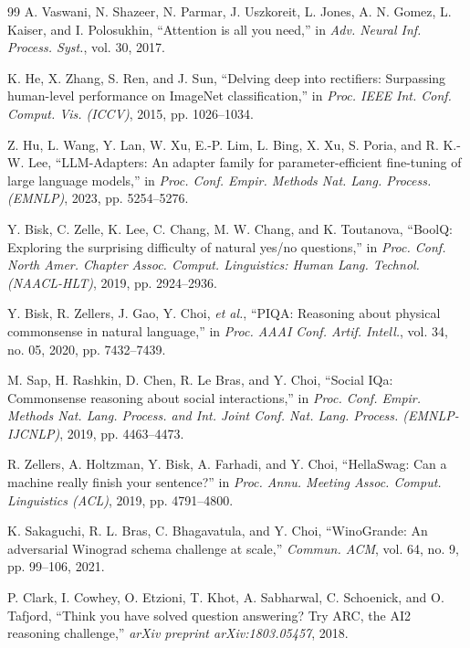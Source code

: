 \documentclass[a4paper,11pt]{article}
\begin{document}
\begin{thebibliography}{99}
A. Vaswani, N. Shazeer, N. Parmar, J. Uszkoreit, L. Jones, A. N. Gomez, L. Kaiser, and I. Polosukhin, ``Attention is all you need,'' in \emph{Adv. Neural Inf. Process. Syst.}, vol. 30, 2017.

K. He, X. Zhang, S. Ren, and J. Sun, ``Delving deep into rectifiers: Surpassing human-level performance on ImageNet classification,'' in \emph{Proc. IEEE Int. Conf. Comput. Vis. (ICCV)}, 2015, pp. 1026--1034.

Z. Hu, L. Wang, Y. Lan, W. Xu, E.-P. Lim, L. Bing, X. Xu, S. Poria, and R. K.-W. Lee, ``LLM-Adapters: An adapter family for parameter-efficient fine-tuning of large language models,'' in \emph{Proc. Conf. Empir. Methods Nat. Lang. Process. (EMNLP)}, 2023, pp. 5254--5276.

Y. Bisk, C. Zelle, K. Lee, C. Chang, M. W. Chang, and K. Toutanova, ``BoolQ: Exploring the surprising difficulty of natural yes/no questions,'' in \emph{Proc. Conf. North Amer. Chapter Assoc. Comput. Linguistics: Human Lang. Technol. (NAACL-HLT)}, 2019, pp. 2924--2936.

Y. Bisk, R. Zellers, J. Gao, Y. Choi, \emph{et al.}, ``PIQA: Reasoning about physical commonsense in natural language,'' in \emph{Proc. AAAI Conf. Artif. Intell.}, vol. 34, no. 05, 2020, pp. 7432--7439.

M. Sap, H. Rashkin, D. Chen, R. Le Bras, and Y. Choi, ``Social IQa: Commonsense reasoning about social interactions,'' in \emph{Proc. Conf. Empir. Methods Nat. Lang. Process. and Int. Joint Conf. Nat. Lang. Process. (EMNLP-IJCNLP)}, 2019, pp. 4463--4473.

R. Zellers, A. Holtzman, Y. Bisk, A. Farhadi, and Y. Choi, ``HellaSwag: Can a machine really finish your sentence?'' in \emph{Proc. Annu. Meeting Assoc. Comput. Linguistics (ACL)}, 2019, pp. 4791--4800.

K. Sakaguchi, R. L. Bras, C. Bhagavatula, and Y. Choi, ``WinoGrande: An adversarial Winograd schema challenge at scale,'' \emph{Commun. ACM}, vol. 64, no. 9, pp. 99--106, 2021.

P. Clark, I. Cowhey, O. Etzioni, T. Khot, A. Sabharwal, C. Schoenick, and O. Tafjord, ``Think you have solved question answering? Try ARC, the AI2 reasoning challenge,'' \emph{arXiv preprint arXiv:1803.05457}, 2018.


\end{thebibliography}
\end{document}
